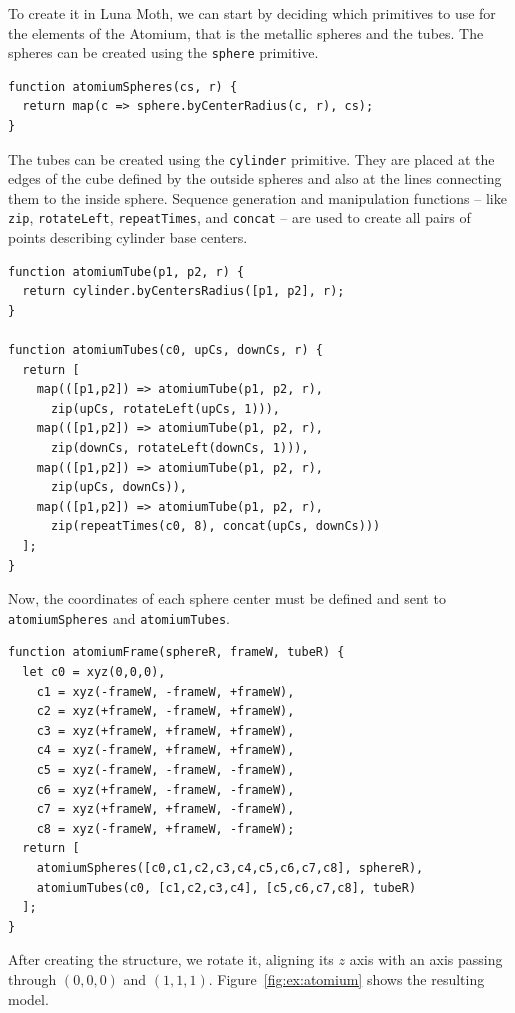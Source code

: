 To create it in Luna Moth, we can start by deciding which primitives to use for the elements of the Atomium, that is the metallic spheres and the tubes.
The spheres can be created using the {\tt sphere} primitive.

\begin{verbatim}
function atomiumSpheres(cs, r) {
  return map(c => sphere.byCenterRadius(c, r), cs);
}
\end{verbatim}

The tubes can be created using the {\tt cylinder} primitive.
They are placed at the edges of the cube defined by the outside spheres and also at the lines connecting them to the inside sphere.
Sequence generation and manipulation functions -- like {\tt zip}, {\tt rotateLeft}, {\tt repeatTimes}, and {\tt concat} -- are used to create all pairs of points describing cylinder base centers.

\begin{verbatim}
function atomiumTube(p1, p2, r) {
  return cylinder.byCentersRadius([p1, p2], r);
}

function atomiumTubes(c0, upCs, downCs, r) {
  return [
    map(([p1,p2]) => atomiumTube(p1, p2, r),
      zip(upCs, rotateLeft(upCs, 1))),
    map(([p1,p2]) => atomiumTube(p1, p2, r),
      zip(downCs, rotateLeft(downCs, 1))),
    map(([p1,p2]) => atomiumTube(p1, p2, r),
      zip(upCs, downCs)),
    map(([p1,p2]) => atomiumTube(p1, p2, r),
      zip(repeatTimes(c0, 8), concat(upCs, downCs)))
  ];
}
\end{verbatim}

Now, the coordinates of each sphere center must be defined and sent to {\tt atomiumSpheres} and {\tt atomiumTubes}.

\begin{verbatim}
function atomiumFrame(sphereR, frameW, tubeR) {
  let c0 = xyz(0,0,0),
    c1 = xyz(-frameW, -frameW, +frameW),
    c2 = xyz(+frameW, -frameW, +frameW),
    c3 = xyz(+frameW, +frameW, +frameW),
    c4 = xyz(-frameW, +frameW, +frameW),
    c5 = xyz(-frameW, -frameW, -frameW),
    c6 = xyz(+frameW, -frameW, -frameW),
    c7 = xyz(+frameW, +frameW, -frameW),
    c8 = xyz(-frameW, +frameW, -frameW);
  return [
    atomiumSpheres([c0,c1,c2,c3,c4,c5,c6,c7,c8], sphereR),
    atomiumTubes(c0, [c1,c2,c3,c4], [c5,c6,c7,c8], tubeR)
  ];
}
\end{verbatim}

After creating the structure, we rotate it, aligning its $z$ axis with an axis passing through $(0,0,0)$ and $(1,1,1)$.
Figure~\ref{fig:ex:atomium} shows the resulting model.

